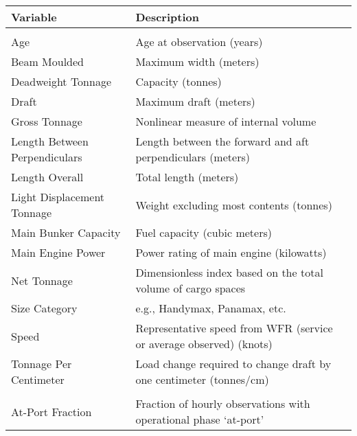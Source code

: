 
\begin{tabular}[t]{>{\raggedright\arraybackslash}p{16em}>{\raggedright\arraybackslash}p{30em}}
\toprule
Variable & Description\\
\midrule
\addlinespace[0.3em]
\multicolumn{2}{l}{\textbf{Ship Characteristics}}\\
\hspace{1em}Age & Age at observation (years)\\
\hspace{1em}Beam Moulded & Maximum width (meters)\\
\hspace{1em}Deadweight Tonnage & Capacity (tonnes)\\
\hspace{1em}Draft & Maximum draft (meters)\\
\hspace{1em}Gross Tonnage & Nonlinear measure of internal volume\\
\hspace{1em}Length Between Perpendiculars & Length between the forward and aft perpendiculars (meters)\\
\hspace{1em}Length Overall & Total length (meters)\\
\hspace{1em}Light Displacement Tonnage & Weight excluding most contents (tonnes)\\
\hspace{1em}Main Bunker Capacity & Fuel capacity (cubic meters)\\
\hspace{1em}Main Engine Power & Power rating of main engine (kilowatts)\\
\hspace{1em}Net Tonnage & Dimensionless index based on the total volume of cargo spaces\\
\hspace{1em}Size Category & e.g., Handymax, Panamax, etc.\\
\hspace{1em}Speed & Representative speed from \ac{WFR} (service or average observed) (knots)\\
\hspace{1em}Tonnage Per Centimeter & Load change required to change draft by one centimeter (tonnes/cm)\\
\addlinespace[0.3em]
\multicolumn{2}{l}{\textbf{Ship Activity}}\\
\hspace{1em}At-Port Fraction & Fraction of hourly observations with operational phase ‘at-port’\\

\end{tabular}

